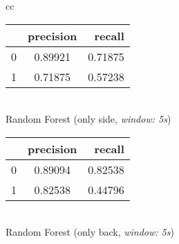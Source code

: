 \begin{table}
\begin{tabular}{cc}    
    \begin{minipage}{.33\linewidth}
        \begin{center}
            \begin{tabular}{ | l | c | r | }
              \hline
               & precision & recall \\ \hline
              0 & 0.89921 & 0.71875 \\ \hline
              1 & 0.71875 & 0.57238 \\
              \hline
            \end{tabular}
            \smallskip
            \\ Random Forest (only side, \textit{window: 5s})
        \end{center}
    \end{minipage}

    \begin{minipage}{.33\linewidth}
        \begin{center}
            \begin{tabular}{ | l | c | r | }
              \hline
               & precision & recall \\ \hline
              0 & 0.89094 & 0.82538 \\ \hline
              1 & 0.82538 & 0.44796 \\
              \hline
            \end{tabular}
            \smallskip
            \\ Random Forest (only back, \textit{window: 5s})
        \end{center}
    \end{minipage}


\end{tabular}
\end{table}
